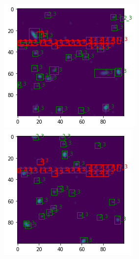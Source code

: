 \documentclass[a4paper,10pt]{report}
\begin{document}
\begin{figure}[!htb]
    \includegraphics[width=\linewidth]{vgg16_162_18276_16929_100.png}
  \endminipage\hfill
    \includegraphics[width=\linewidth]{vgg16_401_17826_17329_100.png}

\end{figure}
\end{document}
